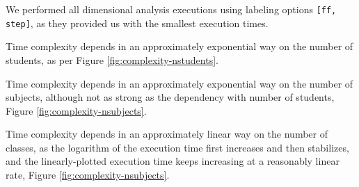 \documentclass[runningheads]{llncs}
\begin{document}
We performed all dimensional analysis executions using labeling options \texttt{[ff, step]}, as they provided us with the smallest execution times.

Time complexity depends in an approximately exponential way on the number of students, as per Figure \ref{fig:complexity-nstudents}.

Time complexity depends in an approximately exponential way on the number of subjects, although not as strong as the dependency with number of students, Figure \ref{fig:complexity-nsubjects}.

Time complexity depends in an approximately linear way on the number of classes, as the logarithm of the execution time first increases and then stabilizes, and the linearly-plotted execution time keeps increasing at a reasonably linear rate, Figure \ref{fig:complexity-nsubjects}.

\newpage
\end{document}
